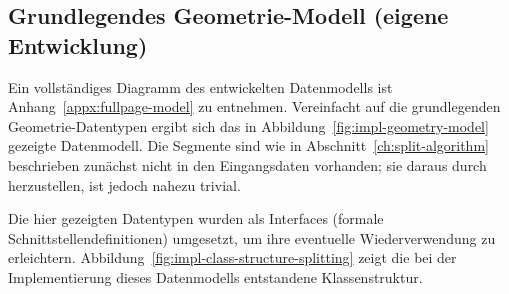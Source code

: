 \documentclass[../main/thesis.tex]{subfiles}
\begin{document}
\subsection{Grundlegendes Geometrie-Modell (eigene Entwicklung)}

Ein vollständiges Diagramm des entwickelten Datenmodells ist Anhang~\ref{appx:fullpage-model} zu entnehmen.
Vereinfacht auf die grundlegenden Geometrie-Datentypen ergibt sich das in Abbildung~\ref{fig:impl-geometry-model} gezeigte Datenmodell.
Die Segmente sind wie in Abschnitt~\ref{ch:split-algorithm} beschrieben zunächst nicht in den Eingangsdaten vorhanden; sie daraus durch  herzustellen, ist jedoch nahezu trivial.



Die hier gezeigten Datentypen wurden als Interfaces (formale Schnittstellendefinitionen) umgesetzt, um ihre eventuelle Wiederverwendung zu erleichtern. 
Abbildung~\ref{fig:impl-class-structure-splitting} zeigt die bei der Implementierung dieses Datenmodells entstandene Klassenstruktur.

\end{document}
